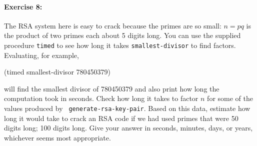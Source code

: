 \paragraph{Exercise 8:}
The RSA system here is easy to crack because the primes are so small:
$n=pq$ is the product of two primes each about 5 digits long.  You
can use the supplied procedure {\tt timed} to see how long it takes
{\tt smallest-divisor} to find factors.  Evaluating, for example,

\beginlisp
(timed smallest-divisor 780450379)
\endlisp

\noindent
will find the smallest divisor of 780450379 and also print
how long the computation took in seconds.  Check how long it takes
to factor $n$ for some of the values produced by {\tt
generate-rsa-key-pair}.  Based on this data, estimate how long it would
take to crack an RSA code if we had used primes that were 50 digits
long; 100 digits long.  Give your answer in seconds, minutes, days,
or years, whichever seems most appropriate.


